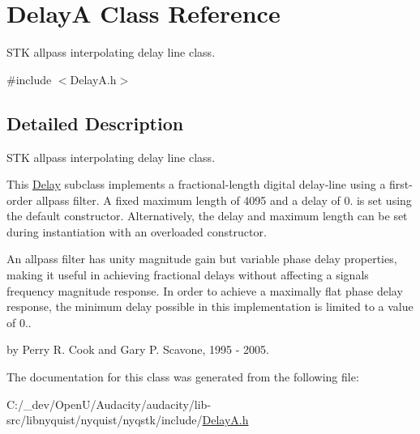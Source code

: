 \hypertarget{class_delay_a}{}\section{DelayA Class Reference}
\label{class_delay_a}


S\+TK allpass interpolating delay line class.  




{\ttfamily \#include $<$Delay\+A.\+h$>$}



\subsection{Detailed Description}
S\+TK allpass interpolating delay line class. 

This \hyperlink{class_delay}{Delay} subclass implements a fractional-\/length digital delay-\/line using a first-\/order allpass filter. A fixed maximum length of 4095 and a delay of 0. is set using the default constructor. Alternatively, the delay and maximum length can be set during instantiation with an overloaded constructor.

An allpass filter has unity magnitude gain but variable phase delay properties, making it useful in achieving fractional delays without affecting a signal\textquotesingle{}s frequency magnitude response. In order to achieve a maximally flat phase delay response, the minimum delay possible in this implementation is limited to a value of 0..

by Perry R. Cook and Gary P. Scavone, 1995 -\/ 2005. 

The documentation for this class was generated from the following file\+:\begin{DoxyCompactItemize}
\item 
C\+:/\+\_\+dev/\+Open\+U/\+Audacity/audacity/lib-\/src/libnyquist/nyquist/nyqstk/include/\hyperlink{_delay_a_8h}{Delay\+A.\+h}\end{DoxyCompactItemize}
